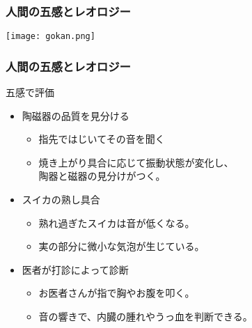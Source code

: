 \documentclass[12pt, dvipdfmx]{beamer}
\begin{document}
\begin{frame}
	\frametitle{人間の五感とレオロジー}
	\begin{center}
		\texttt{[image: gokan.png]}
	\end{center}
\end{frame}

\begin{frame}
	\frametitle{人間の五感とレオロジー}
	\begin{exampleblock}{五感で評価}
		\begin{itemize}
			\item 陶磁器の品質を見分ける
			\begin{itemize}
				\item 指先ではじいてその音を聞く
				\item 焼き上がり具合に応じて振動状態が変化し、\\陶器と磁器の見分けがつく。
			\end{itemize}
			\item スイカの熟し具合
			\begin{itemize}
				\item 熟れ過ぎたスイカは音が低くなる。
				\item 実の部分に微小な気泡が生じている。
			\end{itemize}
			\item 医者が打診によって診断
			\begin{itemize}
				\item お医者さんが指で胸やお腹を叩く。
				\item 音の響きで、内臓の腫れやうっ血を判断できる。
			\end{itemize}
		\end{itemize}
	\end{exampleblock}
\end{frame}
\end{document}
